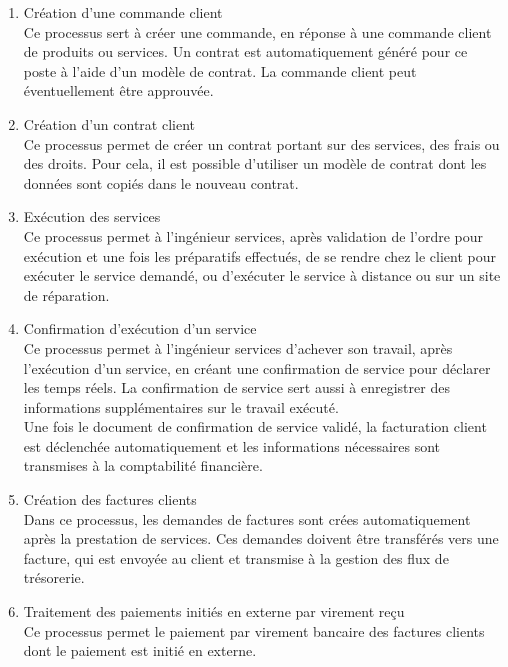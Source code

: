 \begin{enumerate}
\item Création d’une commande client \\
Ce processus sert à créer une commande, en réponse à une commande client de produits ou services. Un contrat est automatiquement généré pour ce poste à l’aide d’un modèle de contrat. La commande client peut éventuellement être approuvée. \\

\item Création d’un contrat client \\
Ce processus permet de créer un contrat portant sur des services, des frais ou des droits. Pour cela, il est possible d’utiliser un modèle de contrat dont les données sont copiés dans le nouveau contrat.\\

\item Exécution des services \\
Ce processus permet à l’ingénieur services, après validation de l’ordre pour exécution et une
fois les préparatifs effectués, de se rendre chez le client pour exécuter le service demandé, ou d’exécuter le service à distance ou sur un site de réparation. \\

\item Confirmation d'exécution d’un service \\
Ce processus permet à l’ingénieur services d’achever son travail, après l’exécution d’un service, en créant une confirmation de service pour déclarer les temps réels. La confirmation de service sert aussi à enregistrer des informations supplémentaires sur le travail exécuté. \\

Une fois le document de confirmation de service validé, la facturation client est déclenchée
automatiquement et les informations nécessaires sont transmises à la comptabilité financière. \\

\item Création des factures clients \\
Dans ce processus, les demandes de factures sont crées automatiquement après la prestation de services. Ces demandes doivent être transférés vers une facture, qui est envoyée au client et transmise à la gestion des flux de trésorerie. \\

\item Traitement des paiements initiés en externe par virement reçu \\
Ce processus permet le paiement par virement bancaire des factures clients dont le paiement est initié en externe.
\end{enumerate}

